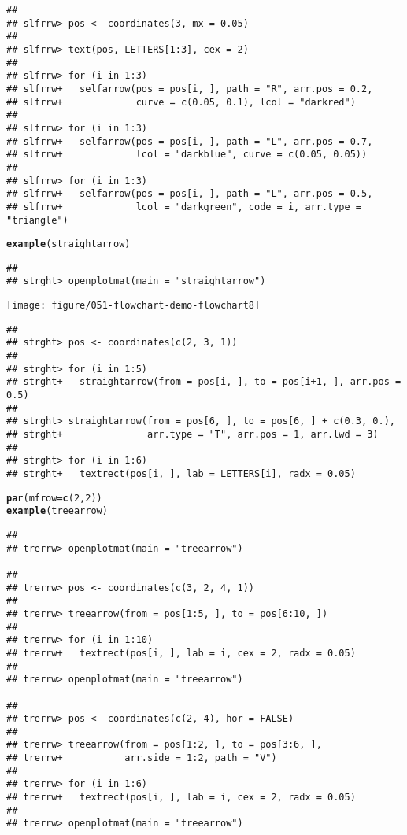 \documentclass{article}\usepackage[]{graphicx}\usepackage[]{color}
\makeatletter
\def\maxwidth{ %
  \ifdim\Gin@nat@width>\linewidth
    \linewidth
  \else
    \Gin@nat@width
  \fi
}
\newcommand{\hlfunctioncall}[1]{\textcolor[rgb]{0.501960784313725,0,0.329411764705882}{\textbf{#1}}}%
\newenvironment{kframe}{%
 \def\at@end@of@kframe{}%
 \ifinner\ifhmode%
  \def\at@end@of@kframe{\end{minipage}}%
  \begin{minipage}{\columnwidth}%
 \fi\fi%
 \def\FrameCommand##1{\hskip\@totalleftmargin \hskip-\fboxsep
 \colorbox{shadecolor}{##1}\hskip-\fboxsep
     \hskip-\linewidth \hskip-\@totalleftmargin \hskip\columnwidth}%
 \MakeFramed {\advance\hsize-\width
   \@totalleftmargin\z@ \linewidth\hsize
   \@setminipage}}%
 {\par\unskip\endMakeFramed%
 \at@end@of@kframe}
\newenvironment{knitrout}{}{} %
\makeatother
\begin{document}
\begin{knitrout}
\begin{kframe}
\begin{verbatim}
## 
## slfrrw> pos <- coordinates(3, mx = 0.05)
## 
## slfrrw> text(pos, LETTERS[1:3], cex = 2)
## 
## slfrrw> for (i in 1:3) 
## slfrrw+   selfarrow(pos = pos[i, ], path = "R", arr.pos = 0.2,
## slfrrw+             curve = c(0.05, 0.1), lcol = "darkred")
## 
## slfrrw> for (i in 1:3) 
## slfrrw+   selfarrow(pos = pos[i, ], path = "L", arr.pos = 0.7,
## slfrrw+             lcol = "darkblue", curve = c(0.05, 0.05))
## 
## slfrrw> for (i in 1:3) 
## slfrrw+   selfarrow(pos = pos[i, ], path = "L", arr.pos = 0.5,
## slfrrw+             lcol = "darkgreen", code = i, arr.type = "triangle")
\end{verbatim}
\begin{alltt}
\hlfunctioncall{example}(straightarrow)
\end{alltt}
\begin{verbatim}
## 
## strght> openplotmat(main = "straightarrow")
\end{verbatim}
\end{kframe}
\texttt{[image: figure/051-flowchart-demo-flowchart8]} 
\begin{kframe}\begin{verbatim}
## 
## strght> pos <- coordinates(c(2, 3, 1))
## 
## strght> for (i in 1:5) 
## strght+   straightarrow(from = pos[i, ], to = pos[i+1, ], arr.pos = 0.5)
## 
## strght> straightarrow(from = pos[6, ], to = pos[6, ] + c(0.3, 0.), 
## strght+               arr.type = "T", arr.pos = 1, arr.lwd = 3)    
## 
## strght> for (i in 1:6) 
## strght+   textrect(pos[i, ], lab = LETTERS[i], radx = 0.05)
\end{verbatim}
\begin{alltt}
\hlfunctioncall{par}(mfrow = \hlfunctioncall{c}(2, 2))
\hlfunctioncall{example}(treearrow)
\end{alltt}
\begin{verbatim}
## 
## trerrw> openplotmat(main = "treearrow")

## 
## trerrw> pos <- coordinates(c(3, 2, 4, 1))
## 
## trerrw> treearrow(from = pos[1:5, ], to = pos[6:10, ])
## 
## trerrw> for (i in 1:10) 
## trerrw+   textrect(pos[i, ], lab = i, cex = 2, radx = 0.05)
## 
## trerrw> openplotmat(main = "treearrow")

## 
## trerrw> pos <- coordinates(c(2, 4), hor = FALSE)
## 
## trerrw> treearrow(from = pos[1:2, ], to = pos[3:6, ], 
## trerrw+           arr.side = 1:2, path = "V")
## 
## trerrw> for (i in 1:6) 
## trerrw+   textrect(pos[i, ], lab = i, cex = 2, radx = 0.05)
## 
## trerrw> openplotmat(main = "treearrow")


\end{verbatim}
\end{kframe}
\end{knitrout}
\end{document}
